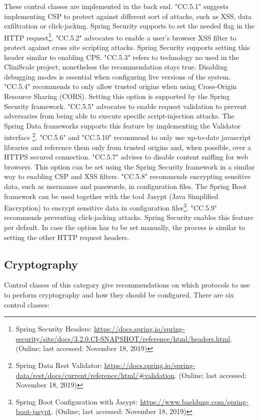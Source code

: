 These control classes are implemented in the back end. "CC.5.1" suggests implementing CSP to protect against different sort of attacks, such as XSS, data exfiltration or click-jacking. Spring Security supports to set the needed flag in the HTTP request\footnote{Spring Security Headers: \url{https://docs.spring.io/spring-security/site/docs/3.2.0.CI-SNAPSHOT/reference/html/headers.html}. (Online; last accessed:  November 18, 2019)}. "CC.5.2" advocates to enable a user’s browser XSS filter to protect against cross site scripting attacks. Spring Security supports setting this header similar to enabling CPS. "CC.5.3" refers to technology no used in the CliniScale project, nonetheless the recommendation stays true. Disabling debugging modes is essential when configuring live versions of the system. "CC.5.4" recommends to only allow trusted origins when using Cross-Origin Resource Sharing (CORS). Setting this option is supported by the Spring Security framework. "CC.5.5" advocates to enable request validation to prevent adversaries from being able to execute specific script-injection attacks. The Spring Data frameworks supports this feature by implementing the Validator interface \footnote{Spring Data Rest Validator: \url{https://docs.spring.io/spring-data/rest/docs/current/reference/html/\#validation}. (Online; last accessed:  November 18, 2019)}. "CC.5.6" and "CC.5.10" recommend to only use up-to-date javascript libraries and reference them only from trusted origins and, when possible, over a HTTPS secured connection. "CC.5.7" advises to disable content sniffing for web browsers. This option can be set using the Spring Security framework in a similar way to enabling CSP and XSS filters. "CC.5.8" recommends encrypting sensitive data, such as usernames and passwords, in configuration files. The Spring Boot framework can be used together with the tool Jasypt (Java Simplified Encryption) to encrypt sensitive data in configuration files\footnote{Spring Boot Configuration with Jasypt: \url{https://www.baeldung.com/spring-boot-jasypt}. (Online; last accessed:  November 18, 2019)}. "CC.5.9" recommends preventing click-jacking attacks. Spring Security enables this feature per default. In case the option has to be set manually, the process is similar to setting the other HTTP request headers.

\subsection{Cryptography}
Control classes of this category give recommendations on which protocols to use to perform cryptography and how they should be configured. There are six control classes:

